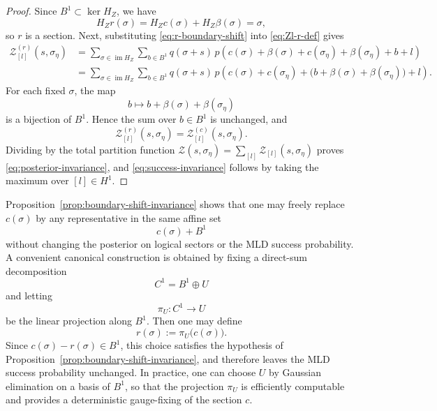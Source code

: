 \documentclass[twoside,english,aps,showpacs,pra,superscriptaddress]{revtex4-2}
\DeclareMathOperator{\im}{im}
\begin{document}
\begin{proof}
Since \(B^1\subset \ker H_Z\), we have
\begin{equation}\label{eq:section-proof-1}
    H_Z r(\sigma)=H_Z c(\sigma)+H_Z\beta(\sigma)=\sigma,
\end{equation}
so \(r\) is a section. Next, substituting \eqref{eq:r-boundary-shift} into \eqref{eq:Zl-r-def} gives
\begin{equation}\label{eq:section-proof-2}
\begin{aligned}
    \mathcal Z^{(r)}_{[l]}(s,\sigma_\eta)
    &=\sum_{\sigma\in \im H_Z}\sum_{b\in B^1}
    q(\sigma+s)\,
    p\!\left(c(\sigma)+\beta(\sigma)+c(\sigma_\eta)+\beta(\sigma_\eta)+b+l\right) \\
    &=\sum_{\sigma\in \im H_Z}\sum_{b\in B^1}
    q(\sigma+s)\,
    p\!\left(c(\sigma)+c(\sigma_\eta)+\bigl(b+\beta(\sigma)+\beta(\sigma_\eta)\bigr)+l\right).
\end{aligned}
\end{equation}
For each fixed \(\sigma\), the map
\begin{equation}\label{eq:b-translation}
    b\longmapsto b+\beta(\sigma)+\beta(\sigma_\eta)
\end{equation}
is a bijection of \(B^1\). Hence the sum over \(b\in B^1\) is unchanged, and
\begin{equation}\label{eq:section-proof-3}
    \mathcal Z^{(r)}_{[l]}(s,\sigma_\eta)
    =
    \mathcal Z^{(c)}_{[l]}(s,\sigma_\eta).
\end{equation}
Dividing by the total partition function \(\mathcal Z(s,\sigma_\eta)=\sum_{[l]}\mathcal Z_{[l]}(s,\sigma_\eta)\) proves \eqref{eq:posterior-invariance}, and \eqref{eq:success-invariance} follows by taking the maximum over \([l]\in H^1\).
\end{proof}

Proposition~\ref{prop:boundary-shift-invariance} shows that one may freely replace \(c(\sigma)\) by any representative in the same affine set
\begin{equation}\label{eq:affine-coset}
    c(\sigma)+B^1
\end{equation}
without changing the posterior on logical sectors or the MLD success probability. 
A convenient canonical construction is obtained by fixing a direct-sum decomposition
\begin{equation}\label{eq:direct-sum-U}
    C^1=B^1\oplus U
\end{equation}
and letting
\begin{equation}\label{eq:pi-U-def}
    \pi_U:C^1\to U
\end{equation}
be the linear projection along \(B^1\). Then one may define
\begin{equation}\label{eq:r-canonical}
    r(\sigma):=\pi_U\bigl(c(\sigma)\bigr).
\end{equation}
Since \(c(\sigma)-r(\sigma)\in B^1\), this choice satisfies the hypothesis of Proposition~\ref{prop:boundary-shift-invariance}, and therefore leaves the MLD success probability unchanged. 
In practice, one can choose \(U\) by Gaussian elimination on a basis of \(B^1\), so that the projection \(\pi_U\) is efficiently computable and provides a deterministic gauge-fixing of the section \(c\).
\end{document}
